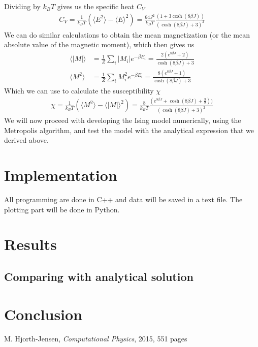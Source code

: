 \documentclass[12pt]{article}
\begin{document}
Dividing by $k_B T$ gives us the specific heat $C_V$
\begin{align*}
C_V = \frac{1}{k_BT} \left( \langle E^2 \rangle
- \langle E \rangle^2 \right) = \frac{64J^2}{k_B T} \frac{(1+3\cosh(8\beta J))}{(\cosh(8\beta J) + 3)^2}
\end{align*}
We can do similar calculations to obtain the mean magnetization (or the mean absolute value of the magnetic moment), which then gives us
\begin{align*}
\langle |M|\rangle &= \frac{1}{Z} \displaystyle \sum_i |M_i| e^{-\beta E_i} = \frac{2(e^{8\beta J} + 2)}{\cosh(8\beta J) + 3} \\
\langle M^2\rangle &= \frac{1}{Z}\displaystyle \sum_i M_i^2e^{-\beta E_i} = \frac{8(e^{8\beta J} + 1)}{\cosh(8\beta J) + 3}
\end{align*}
Which we can use to calculate the susceptibility $\chi$
\begin{align*}
\chi = \frac{1}{k_B T} \left(\langle M^2 \rangle - \langle |M| \rangle^2\right) = \frac{8}{k_B T} \frac{(e^{8\beta J}+ \cosh(8\beta J) + \frac{3}{2}))}{(\cosh(8\beta J) + 3)^2}
\end{align*} 
We will now proceed with developing the Ising model numerically, using the Metropolis algorithm, and test the model with the analytical expression that we derived above.
\FloatBarrier

\section{Implementation} \label{section:implement}
All programming are done in C++ and data will be saved in a text file. The plotting part will be done in Python.
\section{Results} \label{section:result}
\subsection*{Comparing with analytical solution}

\section{Conclusion} \label{section:conclusion}

\FloatBarrier
\begin{thebibliography}{1}
     M. Hjorth-Jensen, \emph{Computational Physics}, 2015, 551 pages
\end{thebibliography}
\end{document}
